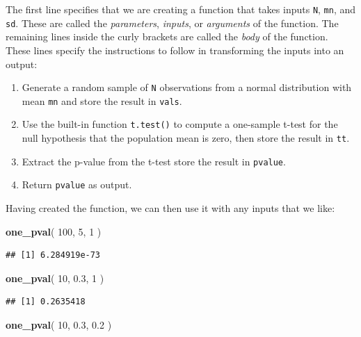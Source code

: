 \documentclass[
]{book}
\newenvironment{Shaded}{\begin{snugshade}}{\end{snugshade}}
\newcommand{\DecValTok}[1]{\textcolor[rgb]{0.00,0.00,0.81}{#1}}
\newcommand{\FloatTok}[1]{\textcolor[rgb]{0.00,0.00,0.81}{#1}}
\newcommand{\FunctionTok}[1]{\textcolor[rgb]{0.13,0.29,0.53}{\textbf{#1}}}
\newcommand{\NormalTok}[1]{#1}
\providecommand{\tightlist}{%
  \setlength{\itemsep}{0pt}\setlength{\parskip}{0pt}}
\begin{document}
The first line specifies that we are creating a function that takes inputs \texttt{N}, \texttt{mn}, and \texttt{sd}. These are called the \emph{parameters}, \emph{inputs}, or \emph{arguments} of the function. The remaining lines inside the curly brackets are called the \emph{body} of the function. These lines specify the instructions to follow in transforming the inputs into an output:

\begin{enumerate}
\def\labelenumi{\arabic{enumi}.}
\tightlist
\item
  Generate a random sample of \texttt{N} observations from a normal distribution with mean \texttt{mn} and store the result in \texttt{vals}.
\item
  Use the built-in function \texttt{t.test()} to compute a one-sample t-test for the null hypothesis that the population mean is zero, then store the result in \texttt{tt}.
\item
  Extract the p-value from the t-test store the result in \texttt{pvalue}.
\item
  Return \texttt{pvalue} as output.
\end{enumerate}

Having created the function, we can then use it with any inputs that we like:

\begin{Shaded}
\begin{Highlighting}[]
\FunctionTok{one\_pval}\NormalTok{( }\DecValTok{100}\NormalTok{, }\DecValTok{5}\NormalTok{, }\DecValTok{1}\NormalTok{ )}
\end{Highlighting}
\end{Shaded}

\begin{verbatim}
## [1] 6.284919e-73
\end{verbatim}

\begin{Shaded}
\begin{Highlighting}[]
\FunctionTok{one\_pval}\NormalTok{( }\DecValTok{10}\NormalTok{, }\FloatTok{0.3}\NormalTok{, }\DecValTok{1}\NormalTok{ )}
\end{Highlighting}
\end{Shaded}

\begin{verbatim}
## [1] 0.2635418
\end{verbatim}

\begin{Shaded}
\begin{Highlighting}[]
\FunctionTok{one\_pval}\NormalTok{( }\DecValTok{10}\NormalTok{, }\FloatTok{0.3}\NormalTok{, }\FloatTok{0.2}\NormalTok{ )}
\end{Highlighting}
\end{Shaded}
\end{document}
